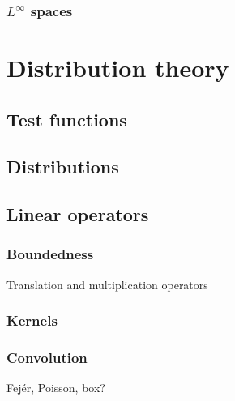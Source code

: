 \documentclass{../../large}
\begin{document}
\section{$L^\infty$ spaces}







\part{Distribution theory}
\chapter{Test functions}


\chapter{Distributions}


\chapter{Linear operators}

\section{Boundedness}

Translation and multiplication operators

\begin{prb}
\end{prb}


\section{Kernels}
\begin{prb}
\end{prb}
\begin{prb}
\end{prb}

\section{Convolution}
\begin{prb}
Fej\'er, Poisson, box?
\end{prb}
\begin{prb}
\end{prb}
\end{document}
